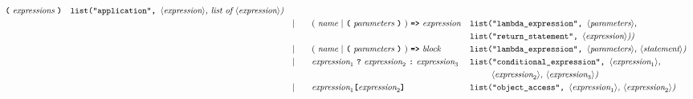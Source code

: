 \begin{alignat*}{9}
                                            \textbf{\texttt{(}}\ \textit{expressions}\
                                            \textbf{\texttt{)}}
                                                           && \texttt{list("application",  } \langle \textit{expression}\rangle \textit{, list of  } \langle \textit{expression}\rangle \textit{)} \\
&&                       && |   &\quad &&   (\ \textit{name}\ | \
                                               \textbf{\texttt{(}}\ \textit{parameters}\ \textbf{\texttt{)}}\
                                            )\
                                            \texttt{\textbf{=>}}\ \textit{expression}
                                            && \texttt{list("lambda\_expression",  } \langle \textit{parameters}\rangle \textit{,}  \\
                                              && && & && && \texttt{list("return\_statement",  } \langle \textit{expression}\rangle \textit{))} \\
&&                       && |   &\quad &&   (\ \textit{name}\ | \
                                               \textbf{\texttt{(}}\ \textit{parameters}\ \textbf{\texttt{)}}\
                                            )\
                                            \texttt{\textbf{=>}}\ \textit{block}
                                                           && \texttt{list("lambda\_expression",  } \langle \textit{parameters}\rangle \textit{,  } \langle \textit{statement}\rangle \textit{)} \\
&&                       && |   &\quad &&   \textit{expression}_1 \ \textbf{\texttt{?}}\
                                            \textit{expression}_2
                                            \ \textbf{\texttt{:}}\
                                            \textit{expression}_3\
                                                           && \texttt{list("conditional\_expression",  } \langle \textit{expression}_1\rangle \textit{,} \\
                                            &&&&&&&&&\ \ \ \ \ \ \texttt{ } \langle \textit{expression}_2\rangle \textit{,  } \langle \textit{expression}_3\rangle \textit{)} \\
&&                       && |   &\quad && \textit{expression}_1 \textbf{\texttt{[}}
                                          \textit{expression}_2 \textbf{\texttt{]}}
                                                           && \texttt{list("object\_access",  } \langle \textit{expression}_1\rangle \textit{,  } \langle \textit{expression}_2\rangle \textit{)} \\

\end{alignat*}
